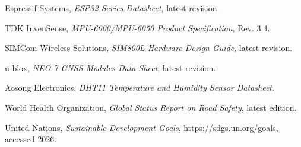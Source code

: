 \documentclass[10pt,a4paper]{article}
\begin{document}
\begin{enumerate}[leftmargin=1.5em, label={[\arabic*]}]
  \item Espressif Systems, \textit{ESP32 Series Datasheet}, latest revision.
  \item TDK InvenSense, \textit{MPU-6000/MPU-6050 Product Specification}, Rev. 3.4.
  \item SIMCom Wireless Solutions, \textit{SIM800L Hardware Design Guide}, latest revision.
  \item u-blox, \textit{NEO-7 GNSS Modules Data Sheet}, latest revision.
  \item Aosong Electronics, \textit{DHT11 Temperature and Humidity Sensor Datasheet}.
  \item World Health Organization, \textit{Global Status Report on Road Safety}, latest edition.
  \item United Nations, \textit{Sustainable Development Goals}, \url{https://sdgs.un.org/goals}, accessed 2026.
\end{enumerate}
\end{document}
